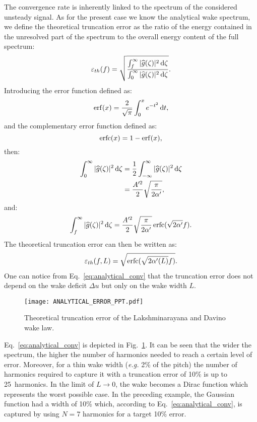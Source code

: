 The convergence rate is inherently linked to
the spectrum of the considered unsteady signal.
As for the present case we know the analytical wake spectrum,
we define the theoretical truncation error as the ratio of
the energy contained in the unresolved part 
of the spectrum to the overall energy content of the full spectrum:
\begin{equation}
    \varepsilon_{th}(f) = \sqrt{\frac{
        \int_f^\infty | \widehat{g}(\zeta)|^2 \diff \zeta
      }{
        \int_0^\infty | \widehat{g}(\zeta)|^2 \diff \zeta
      }}.
    \label{eq:def_truncation_error}
\end{equation}
Introducing the error function defined as:
\begin{equation}
    \operatorname{erf}(x) = \frac{2}{\sqrt{\pi}} \int_0^x e^{-t^2} \mathop{}\!\mathrm{d} t,
\end{equation}
and the complementary error function defined as:
\begin{equation}
    \operatorname{erfc}(x) = 1 - \operatorname{erf}(x),
\end{equation}
then:
\begin{align}
    \int_0^\infty | \widehat{g}(\zeta)|^2 \mathop{}\!\mathrm{d} \zeta 
    &= \frac{1}{2} \int_{- \infty}^\infty | \widehat{g}(\zeta)|^2 \mathop{}\!\mathrm{d} \zeta \\
    &= \frac{A^{\prime 2}}{2} \sqrt{\frac{\pi}{2 \alpha^\prime}},
\end{align}
and:
\begin{equation}
    \int_f^\infty | \widehat{g}(\zeta)|^2 \mathop{}\!\mathrm{d} \zeta = 
      \frac{A^{\prime 2}}{2} \sqrt{\frac{\pi}{2 \alpha^\prime}} \operatorname{erfc} (\sqrt{2 \alpha^\prime} f).
\end{equation}
The theoretical truncation error can then be written as:
\begin{equation}
    \varepsilon_{th}(f, L) = \sqrt{\erfc (\sqrt{2 \alpha^\prime(L) } f)}.
    \label{eq:analytical_conv}
\end{equation}
One can notice from Eq.~\eqref{eq:analytical_conv} that the 
truncation error does not depend on the wake deficit $\Delta u$ 
but only on the wake width $L$.

\begin{figure}[htp]
    \centering\texttt{[image: ANALYTICAL\_ERROR\_PPT.pdf]}
  \caption{Theoretical truncation error of the Lakshminarayana and Davino wake law.}
  \label{fig:analytic_error_paper}
\end{figure}
Eq.~\eqref{eq:analytical_conv} is depicted in
Fig.~\ref{fig:analytic_error_paper}. 
It can be seen that the wider the spectrum,
the higher the number of harmonics needed to
reach a certain level of error. 
Moreover, for a thin wake width (\emph{e.g.} 2\% of the pitch)
the number of harmonics required to capture it with a truncation 
error of 10\% is up to 25~harmonics.
In the limit of $L \to 0$, the wake becomes a Dirac function
which represents the worst possible case.
In the preceding example, the Gaussian function had a width
of 10\% which, according to Eq.~\eqref{eq:analytical_conv},
is captured by using $N=7$ harmonics for a target 10\% error.